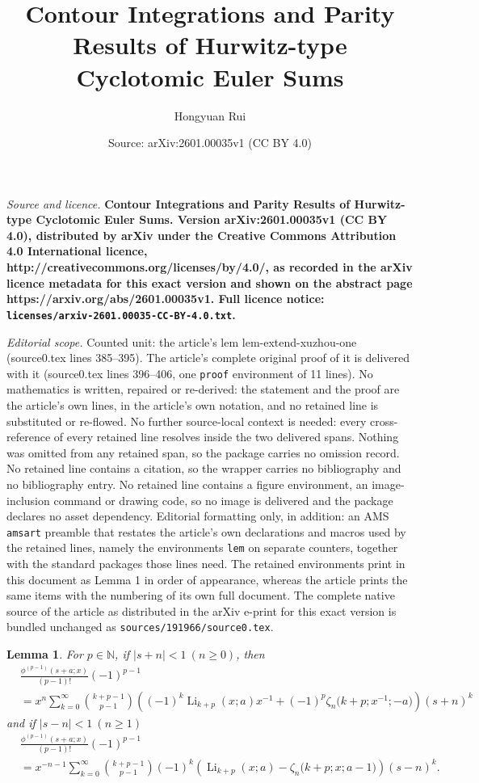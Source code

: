 \documentclass[10pt,a4paper]{amsart}
\title{\bf Contour Integrations and Parity Results of Hurwitz-type Cyclotomic Euler Sums}
\author{Hongyuan Rui}
\date{Source: arXiv:2601.00035v1 (CC BY 4.0)}
\newtheorem{lem}{Lemma}
\DeclareMathOperator{\Li}{Li}
\def\N{\mathbb{N}}
\begin{document}
\maketitle

\noindent\emph{Source and licence.} \bf Contour Integrations and Parity Results of Hurwitz-type Cyclotomic Euler Sums. Version arXiv:2601.00035v1 (CC BY 4.0), distributed by arXiv under the Creative Commons Attribution 4.0 International licence, http://creativecommons.org/licenses/by/4.0/, as recorded in the arXiv licence metadata for this exact version and shown on the abstract page https://arxiv.org/abs/2601.00035v1. Full licence notice: \texttt{licenses/arxiv-2601.00035-CC-BY-4.0.txt}.\par\smallskip

\noindent\textit{Editorial scope.} Counted unit: the article's lem lem-extend-xuzhou-one (source0.tex lines 385--395). The article's complete original proof of it is delivered with it (source0.tex lines 396--406, one \texttt{proof} environment of 11 lines). No mathematics is written, repaired or re-derived: the statement and the proof are the article's own lines, in the article's own notation, and no retained line is substituted or re-flowed.  No further source-local context is needed: every cross-reference of every retained line resolves inside the two delivered spans.  Nothing was omitted from any retained span, so the package carries no omission record.  No retained line contains a citation, so the wrapper carries no bibliography and no bibliography entry.  No retained line contains a figure environment, an image-inclusion command or drawing code, so no image is delivered and the package declares no asset dependency.  Editorial formatting only, in addition: an AMS \texttt{amsart} preamble that restates the article's own declarations and macros used by the retained lines, namely the environments \texttt{lem} on separate counters, together with the standard packages those lines need.  The retained environments print in this document as Lemma 1 in order of appearance, whereas the article prints the same items with the numbering of its own full document.  The complete native source of the article as distributed in the arXiv e-print for this exact version is bundled unchanged as \texttt{sources/191966/source0.tex}.
\begin{lem}\label{lem-extend-xuzhou-one} For $p\in \N$, if $|s+n|<1\ (n\geq 0)$, then
\begin{align}\label{Lexp-phi--n-diffp-1}
&\frac{\phi^{(p-1)}(s+a;x)}{(p-1)!} (-1)^{p-1}\nonumber\\
&=x^n\sum_{k=0}^\infty \binom{k+p-1}{p-1} \left((-1)^k \Li_{k+p}(x;a)x^{-1}+(-1)^p \zeta_n\Big(k+p;x^{-1};-a\Big)\right)(s+n)^k
\end{align}
and if $|s-n|<1\ (n\geq 1)$
\begin{align}\label{Lexp-phi-n-diffp-1}
&\frac{\phi^{(p-1)}(s+a;x)}{(p-1)!} (-1)^{p-1}\nonumber\\
&=x^{-n-1}\sum_{k=0}^\infty \binom{k+p-1}{p-1} (-1)^k  \left( \Li_{k+p}(x;a)-\zeta_{n}\Big(k+p;x;a-1\Big)\right)(s-n)^k.
\end{align}
\end{lem}
\end{document}
